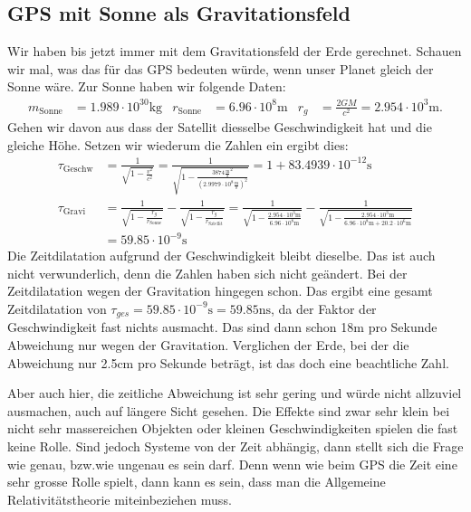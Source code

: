 \begin{refsection}
\subsection{GPS mit Sonne als Gravitationsfeld}
Wir haben bis jetzt immer mit dem Gravitationsfeld der Erde gerechnet. Schauen wir mal, was das für das GPS bedeuten würde, wenn unser Planet gleich der Sonne wäre. Zur Sonne haben wir folgende Daten:
\begin{align*}
m_{\text{Sonne}} &= 1.989 \cdot 10^30\text{kg} & r_{\text{Sonne}} &= 6.96 \cdot 10^8\text{m} & r_g &= \frac{2GM}{c^2} = 2.954 \cdot 10^3\text{m}. 
\end{align*}
Gehen wir davon aus dass der Satellit diesselbe Geschwindigkeit hat und die gleiche Höhe. Setzen wir wiederum die Zahlen ein ergibt dies:
\begin{align*}
\tau_{\text{Geschw}}
&=
\frac{1}{\sqrt{\displaystyle 1 - \frac{v^2}{c^2}}}
=
\frac{1}{\sqrt{\displaystyle 1 - \frac{3874 \frac{\text{m}}{\text{s}}^2}{(2.9979 \cdot 10^8 \frac{\text{m}}{\text{s}} )^2}}}
=
1 + 83.4939 \cdot 10^{-12}\text{s}
\\
\tau_{\text{Gravi}}
&=
\frac{1}{\sqrt{\displaystyle 1-\frac{r_g}{r_{\text{Sonne}}}}} - \frac{1}{\sqrt{\displaystyle 1-\frac{r_g}{r_{\text{Satellit}}}}}
=  
\frac{1}{\sqrt{\displaystyle 1-\frac{2.954 \cdot 10^3\text{m}}{6.96 \cdot 10^8\text{m}}}} - \frac{1}{\sqrt{\displaystyle 1-\frac{2.954 \cdot 10^3\text{m}}{ 6.96 \cdot 10^8\text{m} + 20.2 \cdot 10^6\text{m}}}}
\\
&= 59.85 \cdot 10^{-9}\text{s}
\end{align*}
Die Zeitdilatation aufgrund der Geschwindigkeit bleibt dieselbe. Das ist auch nicht verwunderlich, denn die Zahlen haben sich nicht geändert. Bei der Zeitdilatation wegen der Gravitation hingegen schon. Das ergibt eine gesamt Zeitdilatation von \( \tau_{ges} = 59.85 \cdot 10^{-9}\text{s} = 59.85\text{ns} \), da der Faktor der Geschwindigkeit fast nichts ausmacht. Das sind dann schon 18m pro Sekunde Abweichung nur wegen der Gravitation. Verglichen der Erde, bei der die Abweichung nur 2.5cm pro Sekunde beträgt, ist das doch eine beachtliche Zahl.

Aber auch hier, die zeitliche Abweichung ist sehr gering und würde nicht allzuviel ausmachen, auch auf längere Sicht gesehen. Die Effekte sind zwar sehr klein bei nicht sehr massereichen Objekten oder kleinen Geschwindigkeiten spielen die fast keine Rolle. Sind jedoch Systeme von der Zeit abhängig, dann stellt sich die Frage wie genau, bzw.wie ungenau es sein darf. Denn wenn wie beim GPS die Zeit eine sehr grosse Rolle spielt, dann kann es sein, dass man die Allgemeine Relativitätstheorie miteinbeziehen muss.


\end{refsection}
